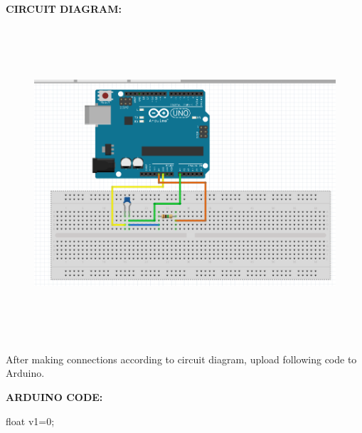 \documentclass[12pt]{article}
\begin{document}
\vspace{\baselineskip}
{\fontsize{14pt}{16.8pt}\selectfont \textbf{CIRCUIT DIAGRAM:}\par}\par

\vspace{\baselineskip}

\begin{figure}[H]
	\begin{Center}
		\includegraphics[width=6.69in,height=4.59in]{./media/image3.png}
	\end{Center}
\end{figure}

\par

\vspace{\baselineskip}
{\fontsize{14pt}{16.8pt}\selectfont After making connections according to circuit diagram, upload following code to Arduino.\par}\par

\vspace{\baselineskip}
{\fontsize{14pt}{16.8pt}\selectfont \textbf{ARDUINO CODE:} \par}\par

\vspace{\baselineskip}
{\fontsize{14pt}{16.8pt}\selectfont float v1=0;\par}\par
\end{document}

